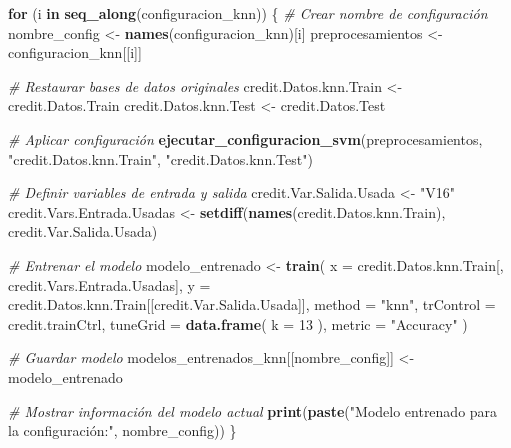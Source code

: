 \documentclass[
]{article}
\newenvironment{Shaded}{\begin{snugshade}}{\end{snugshade}}
\newcommand{\AttributeTok}[1]{\textcolor[rgb]{0.13,0.29,0.53}{#1}}
\newcommand{\CommentTok}[1]{\textcolor[rgb]{0.56,0.35,0.01}{\textit{#1}}}
\newcommand{\ControlFlowTok}[1]{\textcolor[rgb]{0.13,0.29,0.53}{\textbf{#1}}}
\newcommand{\DecValTok}[1]{\textcolor[rgb]{0.00,0.00,0.81}{#1}}
\newcommand{\FunctionTok}[1]{\textcolor[rgb]{0.13,0.29,0.53}{\textbf{#1}}}
\newcommand{\NormalTok}[1]{#1}
\newcommand{\OtherTok}[1]{\textcolor[rgb]{0.56,0.35,0.01}{#1}}
\newcommand{\StringTok}[1]{\textcolor[rgb]{0.31,0.60,0.02}{#1}}
\begin{document}
\begin{Shaded}
\begin{Highlighting}[]
\ControlFlowTok{for}\NormalTok{ (i }\ControlFlowTok{in} \FunctionTok{seq\_along}\NormalTok{(configuracion\_knn)) \{}
  \CommentTok{\# Crear nombre de configuración}
\NormalTok{  nombre\_config }\OtherTok{\textless{}{-}} \FunctionTok{names}\NormalTok{(configuracion\_knn)[i]}
\NormalTok{  preprocesamientos }\OtherTok{\textless{}{-}}\NormalTok{ configuracion\_knn[[i]]}
  
  \CommentTok{\# Restaurar bases de datos originales}
\NormalTok{  credit.Datos.knn.Train }\OtherTok{\textless{}{-}}\NormalTok{ credit.Datos.Train}
\NormalTok{  credit.Datos.knn.Test }\OtherTok{\textless{}{-}}\NormalTok{ credit.Datos.Test}
  
  \CommentTok{\# Aplicar configuración}
  \FunctionTok{ejecutar\_configuracion\_svm}\NormalTok{(preprocesamientos, }\StringTok{"credit.Datos.knn.Train"}\NormalTok{, }\StringTok{"credit.Datos.knn.Test"}\NormalTok{)}

  
  \CommentTok{\# Definir variables de entrada y salida}
\NormalTok{  credit.Var.Salida.Usada }\OtherTok{\textless{}{-}} \StringTok{"V16"}
\NormalTok{  credit.Vars.Entrada.Usadas }\OtherTok{\textless{}{-}} \FunctionTok{setdiff}\NormalTok{(}\FunctionTok{names}\NormalTok{(credit.Datos.knn.Train), credit.Var.Salida.Usada)}
  
  \CommentTok{\# Entrenar el modelo}
\NormalTok{  modelo\_entrenado }\OtherTok{\textless{}{-}} \FunctionTok{train}\NormalTok{(}
    \AttributeTok{x =}\NormalTok{ credit.Datos.knn.Train[, credit.Vars.Entrada.Usadas],}
    \AttributeTok{y =}\NormalTok{ credit.Datos.knn.Train[[credit.Var.Salida.Usada]],}
    \AttributeTok{method =} \StringTok{"knn"}\NormalTok{,}
    \AttributeTok{trControl =}\NormalTok{ credit.trainCtrl,}
    \AttributeTok{tuneGrid =} \FunctionTok{data.frame}\NormalTok{(}
      \AttributeTok{k =} \DecValTok{13}       
\NormalTok{    ),}
    \AttributeTok{metric =} \StringTok{"Accuracy"}
\NormalTok{  )}
  
  \CommentTok{\# Guardar modelo}
\NormalTok{  modelos\_entrenados\_knn[[nombre\_config]] }\OtherTok{\textless{}{-}}\NormalTok{ modelo\_entrenado}
  
  \CommentTok{\# Mostrar información del modelo actual}
  \FunctionTok{print}\NormalTok{(}\FunctionTok{paste}\NormalTok{(}\StringTok{"Modelo entrenado para la configuración:"}\NormalTok{, nombre\_config))}
\NormalTok{\}}
\end{Highlighting}
\end{Shaded}
\end{document}
